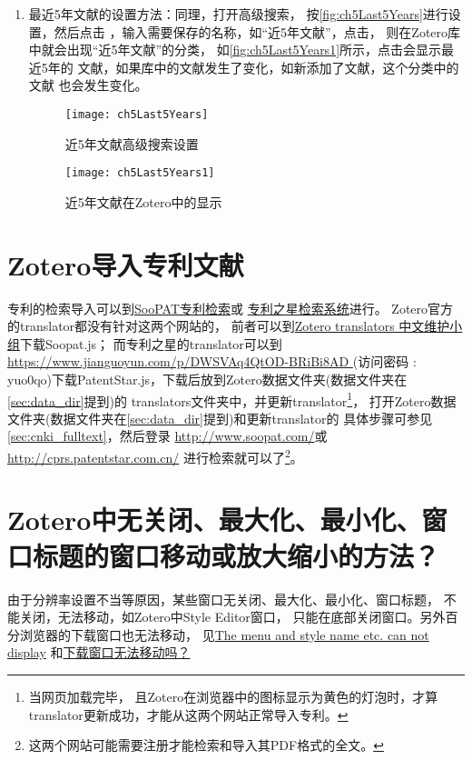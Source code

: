 \documentclass[cn,11pt,chinese]{elegantbook}
\begin{document}
\begin{enumerate}
					\item 最近5年文献的设置方法：同理，打开高级搜索，
					按\autoref{fig:ch5Last5Years}进行设置，然后点击
					，输入需要保存的名称，如“近5年文献”，点击，
					 则在Zotero库中就会出现“近5年文献”的分类，
					 如\autoref{fig:ch5Last5Years1}所示，点击会显示最近5年的
					 文献，如果库中的文献发生了变化，如新添加了文献，这个分类中的文献
					 也会发生变化。
							\begin{figure}[ht]
								\centering
								\texttt{[image: ch5Last5Years]}
								\caption{近5年文献高级搜索设置}
								\label{fig:ch5Last5Years}
							\end{figure}
						\begin{figure}[ht]
							\centering
							\texttt{[image: ch5Last5Years1]}
							\caption{近5年文献在Zotero中的显示}
							\label{fig:ch5Last5Years1}
						\end{figure}		
				\end{enumerate}


		
		\section{Zotero导入专利文献}\label{sec:Patent}
			专利的检索导入可以到\href{http://www.soopat.com/}{SooPAT专利检索}或
			\href{http://cprs.patentstar.com.cn/}{专利之星检索系统}进行。
			Zotero官方的translator都没有针对这两个网站的，
			前者可以到\href{https://github.com/l0o0/translators_CN}
			{Zotero translators 中文维护小组}下载Soopat.js；
			而专利之星的translator可以到\url{https://www.jianguoyun.com/p/DWSVAq4QtOD-BRiBi8AD
			} (访问密码 : yuo0qo)下载PatentStar.js，下载后放到Zotero数据文件夹(数据文件夹在\cref{sec:data_dir}提到)的
			translators文件夹中，并更新translator\footnote{当网页加载完毕，
			且Zotero在浏览器中的图标显示为黄色的灯泡时，才算translator更新成功，才能从这两个网站正常导入专利。}，
			打开Zotero数据文件夹(数据文件夹在\cref{sec:data_dir}提到)和更新translator的
			具体步骤可参见\cref{sec:cnki_fulltext}，然后登录
			\url{http://www.soopat.com/}或\url{http://cprs.patentstar.com.cn/}
			进行检索就可以了\footnote{这两个网站可能需要注册才能检索和导入其PDF格式的全文。}。
		
	\section{Zotero中无关闭、最大化、最小化、窗口标题的窗口移动或放大缩小的方法？}\label{sec:no_max}	
			由于分辨率设置不当等原因，某些窗口无关闭、最大化、最小化、窗口标题，
			不能关闭，无法移动，如Zotero中Style Editor窗口，
			只能在底部关闭窗口。另外百分浏览器的下载窗口也无法移动，
			见\href{https://forums.zotero.org/discussion/86939/
			the-menu-and-style-name-etc-can-not-display#latest}{The menu and style name etc. can not display}
			和\href{https://www.centbrowser.net/zh-cn/forum.php?mod=viewthread&tid=8321&extra=}{下载窗口无法移动吗？}
			
\end{document}
